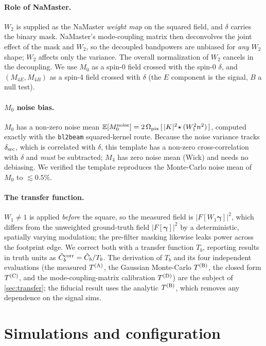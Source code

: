 \documentclass[11pt]{article}
\newcommand{\E}{\mathbb{E}}
\newcommand{\Wone}{W_1}
\newcommand{\Wtwo}{W_2}
\newcommand{\dt}{\delta}
\begin{document}
\paragraph{Role of NaMaster.}
$\Wtwo$ is supplied as the NaMaster \emph{weight map} on the squared field, and
$\dt$ carries the binary mask. NaMaster's mode-coupling matrix then deconvolves
the joint effect of the mask and $\Wtwo$, so the decoupled bandpowers are
unbiased for \emph{any} $\Wtwo$ shape; $\Wtwo$ affects only the variance. The
overall normalization of $\Wtwo$ cancels in the decoupling. We use $M_0$ as a
spin-0 field crossed with the spin-0 $\dt$, and $(M_{4E},M_{4B})$ as a spin-4
field crossed with $\dt$ (the $E$ component is the signal, $B$ a null test).

\paragraph{$M_0$ noise bias.}
$M_0$ has a non-zero noise mean $\E[M_0^{\rm noise}]=2\,\Omega_{\rm
pix}\,[\,|K|^2\!\star(\Wone^2 n^2)\,]$, computed exactly with the \texttt{bl2beam}
squared-kernel route. Because the noise variance tracks $\delta_{\rm src}$,
which is correlated with $\dt$, this template has a non-zero cross-correlation
with $\dt$ and \emph{must} be subtracted; $M_4$ has zero noise mean (Wick) and
needs no debiasing. We verified the template reproduces the Monte-Carlo noise
mean of $M_0$ to $\lesssim0.5\%$.

\paragraph{The transfer function.}
$\Wone\neq1$ is applied \emph{before} the square, so the measured field is
$|F[\Wone\bm\gamma]|^2$, which differs from the unweighted ground-truth field
$|F[\bm\gamma]|^2$ by a deterministic, spatially varying modulation; the
pre-filter masking likewise leaks power across the footprint edge. We correct
both with a transfer function $T_b$, reporting results in truth units as $\hat
C_b^{\rm corr}=\hat C_b/T_b$. The derivation of $T_b$ and its four independent
evaluations (the measured $T^{\rm (A)}$, the Gaussian Monte-Carlo $T^{\rm (B)}$,
the closed form $T^{\rm (C)}$, and the mode-coupling-matrix calibration $T^{\rm
(D)}$) are the subject of \cref{sec:transfer}; the fiducial result uses the
analytic $T^{\rm (B)}$, which removes any dependence on the signal sims.

\section{Simulations and configuration}
\end{document}
